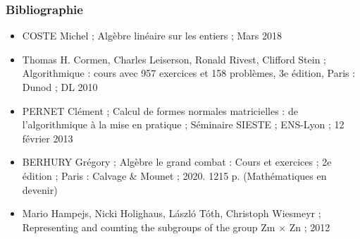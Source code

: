 \documentclass{beamer}
\begin{document}
\begin{frame}
\frametitle{Bibliographie}
\begin{itemize}
    \item COSTE Michel ; Algèbre linéaire sur les entiers ; Mars 2018
    \item Thomas H. Cormen, Charles Leiserson, Ronald Rivest, Clifford Stein ; Algorithmique : cours avec 957 exercices et 158 problèmes, 3e édition, Paris : Dunod ; DL 2010
    \item PERNET Clément ; Calcul de formes normales matricielles : de l’algorithmique à la mise en pratique ; Séminaire SIESTE ; ENS-Lyon ; 12 février 2013
    \item BERHURY Grégory ; Algèbre le grand combat : Cours et exercices ; 2e édition ; Paris : Calvage & Mounet ; 2020. 1215 p. (Mathématiques en devenir)
    \item Mario Hampejs, Nicki Holighaus, László Tóth, Christoph Wiesmeyr ; Representing and counting the subgroups of the group Zm × Zn ; 2012
\end{itemize}
\end{frame}
\end{document}
